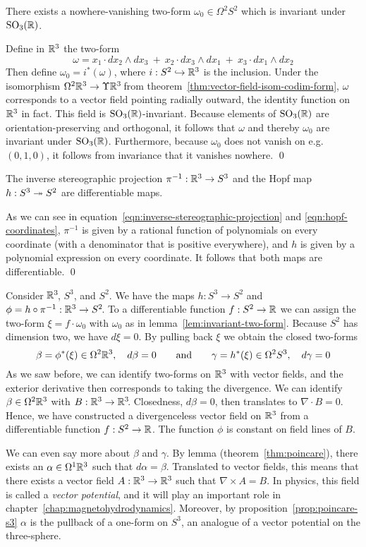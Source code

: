 There exists a nowhere-vanishing two-form $\omega_0 \in \Omega^2 S^2$
which is invariant under $\operatorname{SO}_3(\mathbb{R})$.

\proof
Define in $\mathbb{R}^3$ the two-form
\[ \omega = x_1 \cdot dx_2 \wedge dx_3
          \ + \ x_2 \cdot dx_3 \wedge dx_1
          \ + \ x_3 \cdot dx_1 \wedge dx_2 \]
Then define $\omega_0 = i^*(\omega)$,
where $i : S^2 \hookrightarrow \mathbb{R}^3$ is the inclusion.
Under the isomorphism $\Omega^2 \mathbb{R}^3 \to \Upsilon \mathbb{R}^3\!$
from theorem~\ref{thm:vector-field-isom-codim-form},
$\omega$ corresponds to a vector field pointing radially outward,
the identity function on $\mathbb{R}^3$ in fact.
This field is $\operatorname{SO}_3(\mathbb{R})$-invariant.
Because elements of $\operatorname{SO}_3(\mathbb{R})$ are orientation-preserving
and orthogonal, it follows that $\omega$ and thereby $\omega_0$
are invariant under $\operatorname{SO}_3(\mathbb{R})$.
Furthermore, because $\omega_0$ does not vanish on e.g.
$(0, 1, 0)$,
it follows from invariance that it vanishes nowhere.
\qed

\lemma
The inverse stereographic projection $\pi^{-1} : \mathbb{R}^3 \to S^3$
and the Hopf map $h : S^3 \twoheadrightarrow S^2$ are differentiable maps.

\proof
As we can see in equation~\ref{eqn:inverse-stereographic-projection} and \ref{eqn:hopf-coordinates},
$\pi^{-1}$ is given by a rational function of polynomials on every coordinate
(with a denominator that is positive everywhere),
and $h$ is given by a polynomial expression on every coordinate.
It follows that both maps are differentiable.
\qed

\example
Consider $\mathbb{R}^3\!$, $S^3\!$, and $S^2\!$.
We have the maps $h : S^3 \to S^2$ and $\phi = h \circ \pi^{-1} : \mathbb{R}^3 \to S^2\!$.
To a differentiable function $f : S^2 \to \mathbb{R}$
we can assign the two-form $\xi = f \cdot \omega_0$
with $\omega_0$ as in lemma~\ref{lem:invariant-two-form}.
Because $S^2$ has dimension two, we have $d\xi = 0$.
By pulling back $\xi$ we obtain the closed two-forms
\[ \beta = \phi^*(\xi) \in \Omega^2 \mathbb{R}^3, \quad d\beta = 0
   \qquad\textup{and}\qquad
   \gamma = h^*(\xi) \in \Omega^2 S^3, \quad d\gamma = 0 \]
As we saw before,
we can identify two-forms on $\mathbb{R}^3$ with vector fields,
and the exterior derivative then corresponds to taking the divergence.
We can identify $\beta \in \Omega^2 \mathbb{R}^3$ with $B : \mathbb{R}^3 \to \mathbb{R}^3\!$.
Closedness, $d\beta = 0$, then translates to $\nabla \cdot B = 0$.
Hence, we have constructed a divergenceless vector field on $\mathbb{R}^3$
from a differentiable function $f : S^2 \to \mathbb{R}$.
The function $\phi$ is constant on field lines of $B$.

We can even say more about $\beta$ and $\gamma$.
By \poincares lemma (theorem~\ref{thm:poincare}),
there exists an $\alpha \in \Omega^1 \mathbb{R}^3$ such that $d\alpha = \beta$.
Translated to vector fields,
this means that there exists a vector field $A : \mathbb{R}^3 \to \mathbb{R}^3$
such that $\nabla \times A = B$.
In physics, this field is called a \emph{vector potential},
and it will play an important role in chapter~\ref{chap:magnetohydrodynamics}.
Moreover, by proposition~\ref{prop:poincare-s3} \linebreak $\alpha$ is the pullback
of a one-form on $S^3\!$,
an analogue of a vector potential on the three-sphere.

